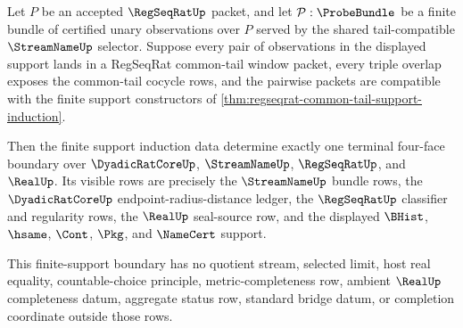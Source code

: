 \begin{theorem}
\label{thm:regseqrat-common-tail-finite-support-gluing-exhaustion}
Let $P$ be an accepted $\RegSeqRatUp$ packet, and let $\mathcal P:\ProbeBundle$ be a finite bundle of certified unary observations over $P$ served by the shared tail-compatible $\StreamNameUp$ selector. Suppose every pair of observations in the displayed support lands in a RegSeqRat common-tail window packet, every triple overlap exposes the common-tail cocycle rows, and the pairwise packets are compatible with the finite support constructors of \autoref{thm:regseqrat-common-tail-support-induction}.

Then the finite support induction data determine exactly one terminal four-face boundary over $\DyadicRatCoreUp$, $\StreamNameUp$, $\RegSeqRatUp$, and $\RealUp$. Its visible rows are precisely the $\StreamNameUp$ bundle rows, the $\DyadicRatCoreUp$ endpoint-radius-distance ledger, the $\RegSeqRatUp$ classifier and regularity rows, the $\RealUp$ seal-source row, and the displayed $\BHist$, $\hsame$, $\Cont$, $\Pkg$, and $\NameCert$ support.

This finite-support boundary has no quotient stream, selected limit, host real equality, countable-choice principle, metric-completeness row, ambient $\RealUp$ completeness datum, aggregate status row, standard bridge datum, or completion coordinate outside those rows.
\end{theorem}
